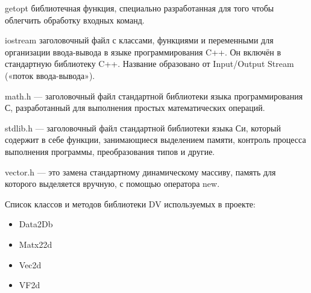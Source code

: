 getopt библиотечная функция, специально разработанная для того чтобы облегчить обработку входных команд. 

iostream заголовочный файл с классами, функциями и переменными для организации ввода-вывода в языке программирования C++. Он включён в стандартную библиотеку C++. Название образовано от Input/Output Stream («поток ввода-вывода»).

math.h — заголовочный файл стандартной библиотеки языка программирования С, разработанный для выполнения простых математических операций.

stdlib.h — заголовочный файл стандартной библиотеки языка Си, который содержит в себе функции, занимающиеся выделением памяти, контроль процесса выполнения программы, преобразования типов и другие.

vector.h — это замена стандартному динамическому массиву, память для которого выделяется вручную, с помощью оператора new.

Список классов и методов библиотеки DV используемых в проекте:
\begin{itemize}
\item Data2Db
\item Matx22d
\item Vec2d
\item VF2d
\end{itemize}